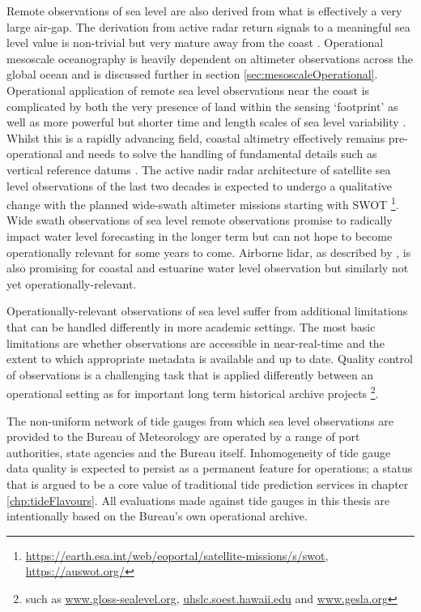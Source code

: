Remote observations of sea level are also derived from what is effectively a very large air-gap. The derivation from active radar return signals to a meaningful sea level value is non-trivial but very mature away from the coast \citep{Fu:2001ub}.  Operational mesoscale oceanography is heavily dependent on altimeter observations across the global ocean and is discussed further in section \ref{sec:mesoscaleOperational}.  
Operational application of remote sea level observations near the coast is complicated by both the very presence of land within the sensing `footprint' as well as more powerful but shorter time and length scales of sea level variability \citep{Vignudelli:2011wl}.   Whilst this is a  rapidly advancing field, coastal altimetry effectively remains pre-operational and needs to solve the handling of fundamental details such as vertical reference datums \citep{10.3389/fmars.2020.549467}.
The active nadir radar architecture of satellite sea level observations of the last two decades is expected to undergo a qualitative change with the planned wide-swath altimeter missions starting with SWOT \footnote{\url{https://earth.esa.int/web/eoportal/satellite-missions/s/swot}, \url{https://auswot.org/}}.   Wide swath observations of sea level remote observations promise to radically impact water level forecasting in the longer term but can not hope to become operationally relevant for some years to come. 
Airborne lidar, as described by \citet{10.1109/tgrs.2018.2847561}, is also promising for coastal and estuarine water level observation but similarly not yet  operationally-relevant.

Operationally-relevant observations of sea level suffer from additional limitations that can be handled differently in more academic settings.   The most basic limitations are whether observations are accessible in near-real-time and the extent to which appropriate metadata is available and up to date.  
Quality control of observations is a challenging task that is applied differently between an operational setting as for important long term historical archive projects \footnote{such as \url{www.gloss-sealevel.org}, \url{uhslc.soest.hawaii.edu} and \url{www.gesla.org}}.

The non-uniform network of tide gauges from which sea level observations are provided to the Bureau of Meteorology are operated by a range of port authorities, state agencies and the Bureau itself. Inhomogeneity of tide gauge data quality is expected to persist as a permanent feature for operations; a status that is argued to be a core value of traditional tide prediction services in chapter \ref{chp:tideFlavours}. All evaluations made against tide gauges in this thesis are intentionally based on the Bureau's own operational archive.

